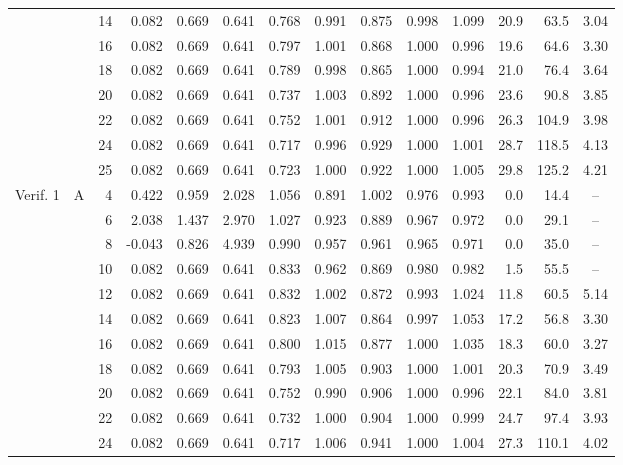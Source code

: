 \begin{table}[htbp]
\begin{adjustbox}{max width=\textwidth}
\begin{tabular}{@{}llr*{3}{r}*{5}{c}rrc@{}}
         &  & 14 & 0.082 & 0.669 & 0.641 & 0.768 & 0.991 & 0.875 & 0.998 & 1.099 & 20.9 & 63.5 & 3.04 \\
         &  & 16 & 0.082 & 0.669 & 0.641 & 0.797 & 1.001 & 0.868 & 1.000 & 0.996 & 19.6 & 64.6 & 3.30 \\
         &  & 18 & 0.082 & 0.669 & 0.641 & 0.789 & 0.998 & 0.865 & 1.000 & 0.994 & 21.0 & 76.4 & 3.64 \\
         &  & 20 & 0.082 & 0.669 & 0.641 & 0.737 & 1.003 & 0.892 & 1.000 & 0.996 & 23.6 & 90.8 & 3.85 \\
         &  & 22 & 0.082 & 0.669 & 0.641 & 0.752 & 1.001 & 0.912 & 1.000 & 0.996 & 26.3 & 104.9 & 3.98 \\
         &  & 24 & 0.082 & 0.669 & 0.641 & 0.717 & 0.996 & 0.929 & 1.000 & 1.001 & 28.7 & 118.5 & 4.13 \\
         &  & 25 & 0.082 & 0.669 & 0.641 & 0.723 & 1.000 & 0.922 & 1.000 & 1.005 & 29.8 & 125.2 & 4.21 \\
        \midrule
        Verif. 1 & A & 4 & 0.422 & 0.959 & 2.028 & 1.056 & 0.891 & 1.002 & 0.976 & 0.993 & 0.0 & 14.4 & -- \\
         &  & 6 & 2.038 & 1.437 & 2.970 & 1.027 & 0.923 & 0.889 & 0.967 & 0.972 & 0.0 & 29.1 & -- \\
         &  & 8 & -0.043 & 0.826 & 4.939 & 0.990 & 0.957 & 0.961 & 0.965 & 0.971 & 0.0 & 35.0 & -- \\
         &  & 10 & 0.082 & 0.669 & 0.641 & 0.833 & 0.962 & 0.869 & 0.980 & 0.982 & 1.5 & 55.5 & -- \\
         &  & 12 & 0.082 & 0.669 & 0.641 & 0.832 & 1.002 & 0.872 & 0.993 & 1.024 & 11.8 & 60.5 & 5.14 \\
         &  & 14 & 0.082 & 0.669 & 0.641 & 0.823 & 1.007 & 0.864 & 0.997 & 1.053 & 17.2 & 56.8 & 3.30 \\
         &  & 16 & 0.082 & 0.669 & 0.641 & 0.800 & 1.015 & 0.877 & 1.000 & 1.035 & 18.3 & 60.0 & 3.27 \\
         &  & 18 & 0.082 & 0.669 & 0.641 & 0.793 & 1.005 & 0.903 & 1.000 & 1.001 & 20.3 & 70.9 & 3.49 \\
         &  & 20 & 0.082 & 0.669 & 0.641 & 0.752 & 0.990 & 0.906 & 1.000 & 0.996 & 22.1 & 84.0 & 3.81 \\
         &  & 22 & 0.082 & 0.669 & 0.641 & 0.732 & 1.000 & 0.904 & 1.000 & 0.999 & 24.7 & 97.4 & 3.93 \\
         &  & 24 & 0.082 & 0.669 & 0.641 & 0.717 & 1.006 & 0.941 & 1.000 & 1.004 & 27.3 & 110.1 & 4.02 \\

\end{tabular}
\end{adjustbox}
\end{table}
